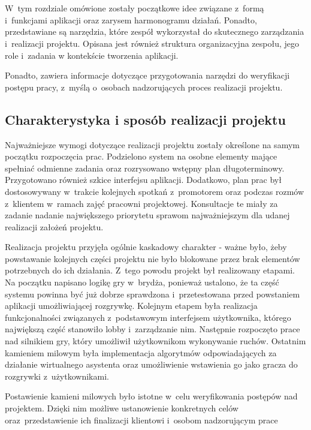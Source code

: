 \chapter{\ChapterTitleWorkOrganization}
\label{sec:organizacja-pracy}

W~tym rozdziale omówione zostały początkowe idee związane z~formą i~funkcjami
aplikacji oraz zarysem harmonogramu działań. Ponadto, przedstawiane
są narzędzia, które zespół wykorzystał do skutecznego zarządzania
i~realizacji projektu. Opisana jest również struktura organizacyjna
zespołu, jego role i~zadania w kontekście tworzenia aplikacji.

Ponadto, zawiera informacje dotyczące przygotowania narzędzi do
weryfikacji postępu pracy, z~myślą o~osobach nadzorujących proces
realizacji projektu.

\section{Charakterystyka i sposób realizacji projektu}

Najważniejsze wymogi dotyczące realizacji projektu 
zostały określone na samym początku rozpoczęcia prac. Podzielono system na osobne elementy 
mające spełniać odmienne zadania oraz rozrysowano wstępny plan długoterminowy. Przygotowano 
również szkice interfejsu aplikacji. Dodatkowo, plan prac był dostosowywany w~trakcie kolejnych spotkań z~promotorem oraz 
podczas rozmów z~klientem w~ramach zajęć pracowni projektowej.
Konsultacje te miały za zadanie nadanie największego priorytetu sprawom najważniejszym 
dla udanej realizacji założeń projektu.

Realizacja projektu przyjęła ogólnie kaskadowy charakter - 
ważne było, żeby powstawanie kolejnych części projektu nie było blokowane przez
brak elementów potrzebnych do ich działania. Z~tego powodu projekt był realizowany
etapami. Na początku napisano logikę gry w~brydża, ponieważ ustalono, że ta część
systemu powinna być już dobrze sprawdzona i~przetestowana przed powstaniem
aplikacji umożliwiającej rozgrywkę. Kolejnym etapem była realizacja funkcjonalności
związanych z~podstawowym interfejsem użytkownika, którego największą część
stanowiło lobby i~zarządzanie nim. Następnie rozpoczęto prace nad silnikiem gry, który
umożliwił użytkownikom wykonywanie ruchów. Ostatnim kamieniem milowym była implementacja
algorytmów odpowiadających za działanie wirtualnego asystenta oraz umożliwienie
wstawienia go jako gracza do rozgrywki z~użytkownikami.

Postawienie kamieni milowych było istotne w~celu weryfikowania postępów
nad projektem. Dzięki nim możliwe ustanowienie konkretnych celów oraz~przedstawienie
ich finalizacji klientowi i~osobom nadzorującym prace

